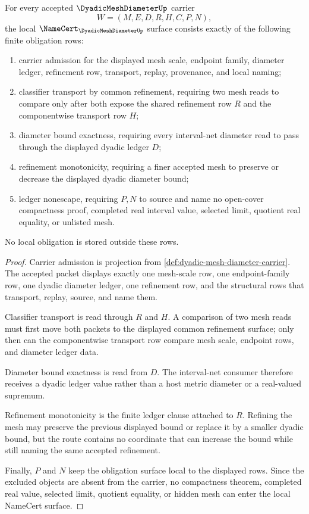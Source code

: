 \begin{theorem}
\label{thm:dyadic-mesh-diameter-namecert-obligations}
For every accepted $\DyadicMeshDiameterUp$ carrier
$$
W=(M,E,D,R,H,C,P,N),
$$
the local $\NameCert_{\DyadicMeshDiameterUp}$ surface consists exactly of the following finite obligation rows:
\begin{enumerate}
\item carrier admission for the displayed mesh scale, endpoint family, diameter ledger, refinement row, transport, replay, provenance, and local naming;
\item classifier transport by common refinement, requiring two mesh reads to compare only after both expose the shared refinement row $R$ and the componentwise transport row $H$;
\item diameter bound exactness, requiring every interval-net diameter read to pass through the displayed dyadic ledger $D$;
\item refinement monotonicity, requiring a finer accepted mesh to preserve or decrease the displayed dyadic diameter bound;
\item ledger nonescape, requiring $P,N$ to source and name no open-cover compactness proof, completed real interval value, selected limit, quotient real equality, or unlisted mesh.
\end{enumerate}
No local obligation is stored outside these rows.
\end{theorem}
\begin{proof}
Carrier admission is projection from \autoref{def:dyadic-mesh-diameter-carrier}. The accepted packet displays exactly one mesh-scale row, one endpoint-family row, one dyadic diameter ledger, one refinement row, and the structural rows that transport, replay, source, and name them.

Classifier transport is read through $R$ and $H$. A comparison of two mesh reads must first move both packets to the displayed common refinement surface; only then can the componentwise transport row compare mesh scale, endpoint rows, and diameter ledger data.

Diameter bound exactness is read from $D$. The interval-net consumer therefore receives a dyadic ledger value rather than a host metric diameter or a real-valued supremum.

Refinement monotonicity is the finite ledger clause attached to $R$. Refining the mesh may preserve the previous displayed bound or replace it by a smaller dyadic bound, but the route contains no coordinate that can increase the bound while still naming the same accepted refinement.

Finally, $P$ and $N$ keep the obligation surface local to the displayed rows. Since the excluded objects are absent from the carrier, no compactness theorem, completed real value, selected limit, quotient equality, or hidden mesh can enter the local NameCert surface.
\end{proof}

